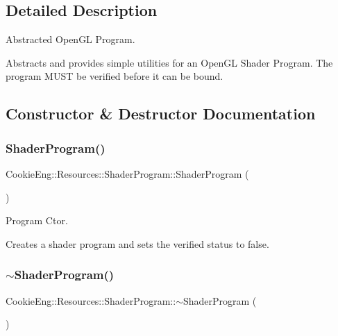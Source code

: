 \subsection{Detailed Description}
Abstracted Open\+GL Program. 

Abstracts and provides simple utilities for an Open\+GL Shader Program. The program M\+U\+ST be verified before it can be bound. 

\subsection{Constructor \& Destructor Documentation}
\mbox{\label{class_cookie_eng_1_1_resources_1_1_shader_program_a2de1a879247aa4ee38fc2c37408c5285}} 
\subsubsection{\texorpdfstring{Shader\+Program()}{ShaderProgram()}}
{\footnotesize\ttfamily Cookie\+Eng\+::\+Resources\+::\+Shader\+Program\+::\+Shader\+Program (\begin{DoxyParamCaption}{ }\end{DoxyParamCaption})}



Program Ctor. 

Creates a shader program and sets the verified status to false. \mbox{\label{class_cookie_eng_1_1_resources_1_1_shader_program_a453b80b995d1b352c73fbac672d4dbc5}} 
\subsubsection{\texorpdfstring{$\sim$\+Shader\+Program()}{~ShaderProgram()}}
{\footnotesize\ttfamily Cookie\+Eng\+::\+Resources\+::\+Shader\+Program\+::$\sim$\+Shader\+Program (\begin{DoxyParamCaption}{ }\end{DoxyParamCaption})\hspace{0.3cm}{\ttfamily [inline]}}



